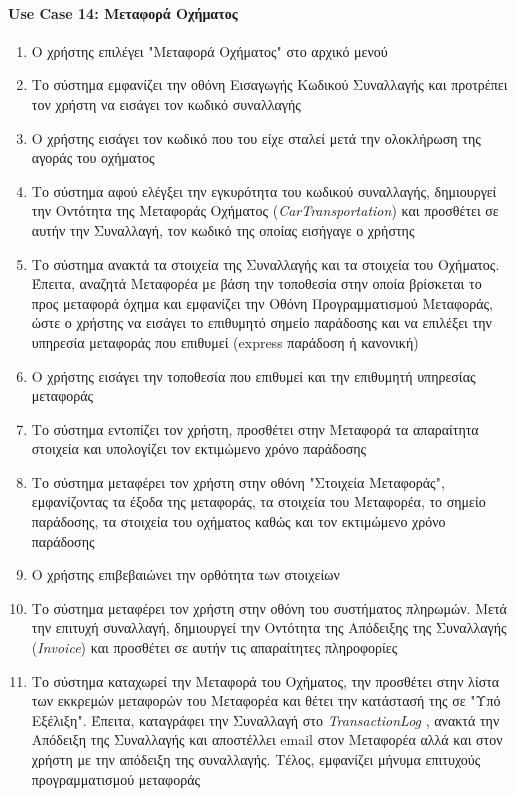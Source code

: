 \documentclass{../ol-softwaremanual}
\begin{document}
	\paragraph{\en Use Case 14: \gr Μεταφορά Οχήματος}  
	\begin{enumerate}
		\item Ο χρήστης επιλέγει \en"\gr Μεταφορά Οχήματος\en" \gr στο αρχικό μενού
		\item Το σύστημα εμφανίζει την οθόνη Εισαγωγής Κωδικού Συναλλαγής και προτρέπει τον χρήστη να εισάγει τον κωδικό συναλλαγής
		\item Ο χρήστης εισάγει τον κωδικό που του είχε σταλεί μετά την ολοκλήρωση της αγοράς του οχήματος
		\item Το σύστημα αφού ελέγξει την εγκυρότητα του κωδικού συναλλαγής, δημιουργεί την Οντότητα της Μεταφοράς Οχήματος (\en\textit{CarTransportation}\gr) και προσθέτει σε αυτήν την Συναλλαγή, τον κωδικό της οποίας εισήγαγε ο χρήστης
		\item Το σύστημα ανακτά τα στοιχεία της Συναλλαγής και τα στοιχεία του Οχήματος. Έπειτα, αναζητά Μεταφορέα με βάση την τοποθεσία στην οποία βρίσκεται το προς μεταφορά όχημα και εμφανίζει την Οθόνη Προγραμματισμού Μεταφοράς, ώστε ο χρήστης να εισάγει το επιθυμητό σημείο παράδοσης και να επιλέξει την υπηρεσία μεταφοράς που επιθυμεί (\en express \gr παράδοση ή κανονική)		
		\item Ο χρήστης εισάγει την τοποθεσία που επιθυμεί και την επιθυμητή υπηρεσίας μεταφοράς
		\item Το σύστημα εντοπίζει τον χρήστη, προσθέτει στην Μεταφορά τα απαραίτητα στοιχεία και υπολογίζει τον εκτιμώμενο χρόνο παράδοσης
		\item Το σύστημα μεταφέρει τον χρήστη στην οθόνη \en"\gr Στοιχεία Μεταφοράς\en"\gr, εμφανίζοντας τα έξοδα της μεταφοράς, τα στοιχεία του Μεταφορέα, το σημείο παράδοσης, τα στοιχεία του οχήματος καθώς και τον εκτιμώμενο χρόνο παράδοσης 
		\item Ο χρήστης επιβεβαιώνει την ορθότητα των στοιχείων 				
		\item Το σύστημα μεταφέρει τον χρήστη στην οθόνη του συστήματος πληρωμών. Μετά την επιτυχή συναλλαγή, δημιουργεί την Οντότητα της Απόδειξης της Συναλλαγής (\en \textit{Invoice}\gr) και προσθέτει σε αυτήν τις απαραίτητες πληροφορίες  
		\item Το σύστημα καταχωρεί την Μεταφορά του Οχήματος, την προσθέτει στην λίστα των εκκρεμών μεταφορών του Μεταφορέα και θέτει την κατάστασή της σε \en"\gr Υπό Εξέλιξη\en"\gr. Έπειτα, καταγράφει την Συναλλαγή στο \en \textit{TransactionLog} \gr, ανακτά την Απόδειξη της Συναλλαγής και αποστέλλει \en email \gr στον Μεταφορέα αλλά και στον χρήστη με την απόδειξη της συναλλαγής. Τέλος, εμφανίζει μήνυμα επιτυχούς προγραμματισμού μεταφοράς
	\end{enumerate}
	
\end{document}
